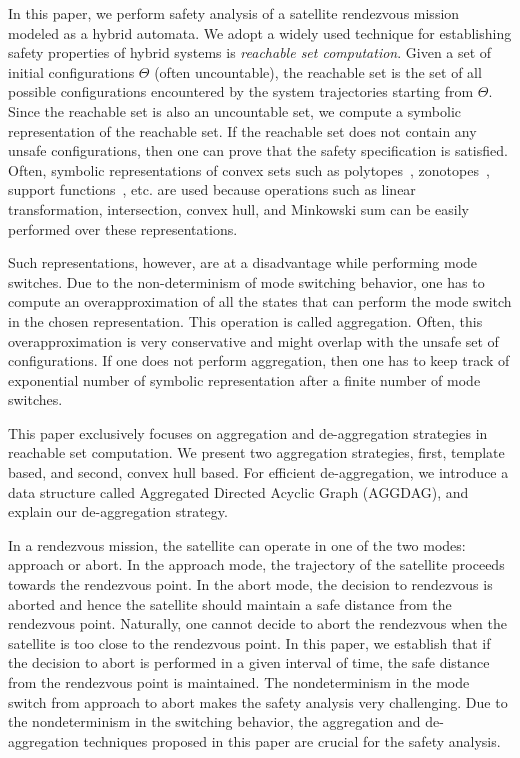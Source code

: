 In this paper, we perform safety analysis of a satellite rendezvous mission modeled as a hybrid automata.
%
We adopt a widely used technique for establishing safety properties of hybrid systems is {\em reachable set computation}.
%
%
Given a set of initial configurations $\Theta$ (often uncountable), the reachable set is the set of all possible configurations encountered by the system trajectories starting from $\Theta$. 
%
Since the reachable set is also an uncountable set, we compute a symbolic representation of the reachable set.
%
If the reachable set does not contain any unsafe configurations, then one can prove that the safety specification is satisfied.
%
Often, symbolic representations of convex sets such as polytopes~\cite{Frehse05_phaver}, zonotopes~\cite{girard2006efficient}, support functions~\cite{spaceex}, etc. are used because operations such as linear transformation, intersection, convex hull, and Minkowski sum can be easily performed over these representations.
%

Such representations, however, are at a disadvantage while performing mode switches.
%
Due to the non-determinism of mode switching behavior, one has to compute an overapproximation of all the states that can perform the mode switch in the chosen representation.
%
This operation is called aggregation.
%
Often, this overapproximation is very conservative and might overlap with the unsafe set of configurations.
%
If one does not perform aggregation, then one has to keep track of exponential number of symbolic representation after a finite number of mode switches.

This paper exclusively focuses on aggregation and de-aggregation strategies in reachable set computation. 
%
We present two aggregation strategies, first, template based, and second, convex hull based. 
%
For efficient de-aggregation, we introduce a data structure called Aggregated Directed Acyclic Graph (AGGDAG), and explain our de-aggregation strategy.
%

%
In a rendezvous mission, the satellite can operate in one of the two modes: approach or abort. 
%
In the approach mode, the trajectory of the satellite proceeds towards the rendezvous point. 
%
In the abort mode, the decision to rendezvous is aborted and hence the satellite should maintain a safe distance from the rendezvous point. 
%
Naturally, one cannot decide to abort the rendezvous when the satellite is too close to the rendezvous point.
%
In this paper, we establish that if the decision to abort is performed in a given interval of time, the safe distance from the rendezvous point is maintained.
%
The nondeterminism in the mode switch from approach to abort makes the safety analysis very challenging.
%
Due to the nondeterminism in the switching behavior, the aggregation and de-aggregation techniques proposed in this paper are crucial for the safety analysis.

